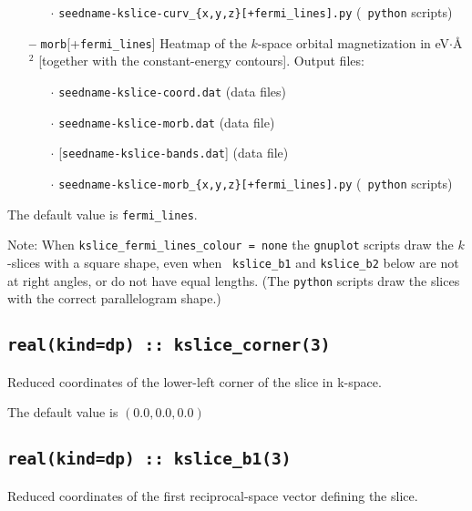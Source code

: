 \begin{itemize}
\begin{itemize}
  \item[$\cdot$] {\tt seedname-kslice-curv\_\{x,y,z\}[+fermi\_lines].py} ({\tt
      python} scripts) 
    
  \end{itemize}

\item[{\bf --}] \verb#morb#[+\verb#fermi_lines#] Heatmap of the
  $k$-space orbital magnetization in eV$\cdot$\AA$^2$ [together with
  the constant-energy contours]. Output files:

  \begin{itemize}

  \item[$\cdot$] {\tt seedname-kslice-coord.dat} (data files)
    
  \item[$\cdot$] {\tt seedname-kslice-morb.dat} (data file)

  \item[$\cdot$] [{\tt seedname-kslice-bands.dat}] (data file)
    
  \item[$\cdot$] {\tt seedname-kslice-morb\_\{x,y,z\}[+fermi\_lines].py} ({\tt
      python} scripts)
    
  \end{itemize}

\end{itemize}

The default value is {\tt fermi\_lines}.

Note: When {\tt kslice\_fermi\_lines\_colour = none} the {\tt gnuplot}
scripts draw the $k$-slices with a square shape, even when {\tt
  kslice\_b1} and {\tt kslice\_b2} below are not at right angles, or
do not have equal lengths.  (The {\tt python} scripts draw the slices
with the correct parallelogram shape.)

\subsection[kslice\_corner]{\tt real(kind=dp) :: kslice\_corner(3)}
Reduced coordinates of the lower-left corner of the slice in k-space.

The default value is $(0.0,0.0,0.0)$

\subsection[kslice\_corner]{\tt real(kind=dp) :: kslice\_b1(3)}
Reduced coordinates of the first reciprocal-space vector 
defining the slice.

